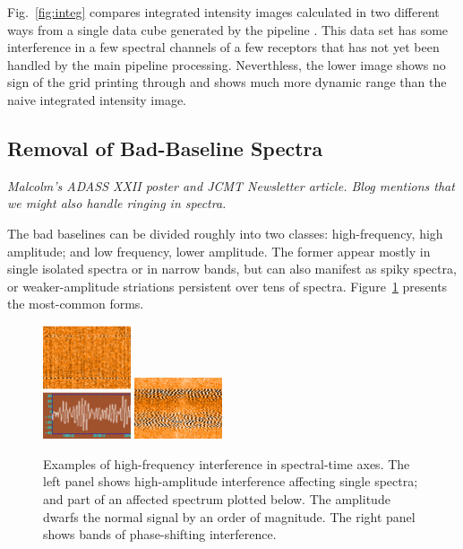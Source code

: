 \documentclass[final,authoryear,5p,times,twocolumn]{elsarticle}
\begin{document}
Fig.\ \ref{fig:integ} compares integrated intensity images calculated
in two different ways from a single data cube generated by the
pipeline \citep[see][for details of earlier
reductions of these data]{2010MNRAS.409.1412G,2010A&A...523A..29D}. This data set
has some interference in a few spectral channels of a few receptors
that has not yet been handled by the main pipeline
processing. Neverthless, the lower image shows no sign of the grid
printing through and shows much more dynamic range than the naive
integrated intensity image.

\subsection{Removal of Bad-Baseline Spectra}



\textit{Malcolm's ADASS XXII poster and JCMT Newsletter article. Blog mentions
that we might also handle ringing in spectra.}

The bad baselines can be divided roughly into two classes:
high-frequency, high amplitude; and low frequency, lower
amplitude. The former appear mostly in single isolated spectra or in
narrow bands, but can also manifest as spiky spectra, or
weaker-amplitude striations persistent over tens of spectra.
Figure~\ref{fig:badbase:highfreq} presents the most-common forms.

\begin{figure}[!ht]
\includegraphics[width=0.23\textwidth]{P61_f1a}
\includegraphics[width=0.23\textwidth]{P61_f1b}
\caption{Examples of high-frequency interference in spectral-time
  axes. The left panel shows high-amplitude interference affecting
  single spectra; and part of an affected spectrum plotted below. The
  amplitude dwarfs the normal signal by an order of magnitude. The
  right panel shows bands of phase-shifting interference.}
\label{fig:badbase:highfreq}
\end{figure}
\end{document}
